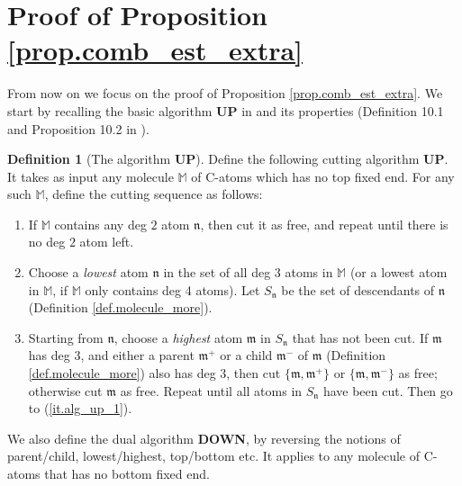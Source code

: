 \documentclass[10pt, reqno]{amsart}
\newcommand{\Mb}{\mathbb M}
\newcommand{\mf}{\mathfrak m}
\newcommand{\nf}{\mathfrak n}
\theoremstyle{definition}
\newtheorem{definition}[theorem]{Definition}
\theoremstyle{remark}
\numberwithin{equation}{section}
\begin{document}
\section{Proof of Proposition \ref{prop.comb_est_extra}}\label{sec.error} From now on we focus on the proof of Proposition \ref{prop.comb_est_extra}. We start by recalling the basic algorithm \textbf{UP} in \cite{DHM24} and its properties (Definition 10.1 and Proposition 10.2 in \cite{DHM24}).
\begin{definition}[The algorithm \textbf{UP}]\label{def.alg_up} Define the following cutting algorithm \textbf{UP}. It takes as input any molecule $\Mb$ of C-atoms which has no top fixed end. For any such $\Mb$, define the cutting sequence as follows:
\begin{enumerate}
\item\label{it.alg_up_1} If $\Mb$ contains any deg $2$ atom $\nf$, then cut it as free, and repeat until there is no deg $2$ atom left.
\item\label{it.alg_up_2} Choose a \emph{lowest} atom $\nf$ in the set of all deg 3 atoms in $\Mb$ (or a lowest atom in $\Mb$, if $\Mb$ only contains deg 4 atoms). Let $S_\nf$ be the set of descendants of $\nf$ (Definition \ref{def.molecule_more}).
\item \label{it.alg_up_3} Starting from $\nf$, choose a \emph{highest} atom $\mf$ in $S_\nf$ that has not been cut. If $\mf$ has deg 3, and either a parent $\mf^+$ or a child $\mf^-$ of $\mf$ (Definition \ref{def.molecule_more}) also has deg 3, then cut $\{\mf,\mf^+\}$ or $\{\mf,\mf^-\}$ as free; otherwise cut $\mf$ as free. Repeat until all atoms in $S_\nf$ have been cut. Then go to (\ref{it.alg_up_1}).
\end{enumerate}

We also define the dual algorithm \textbf{DOWN}, by reversing the notions of parent/child, lowest/highest, top/bottom etc. It applies to any molecule of C-atoms that has no bottom fixed end.
\end{definition}
\end{document}
